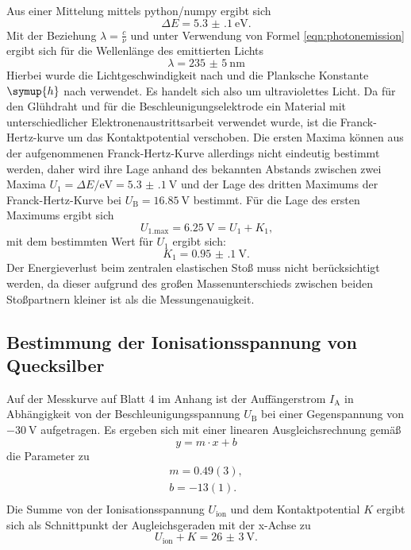Aus einer Mittelung mittels python/numpy \cite{numpy} ergibt sich
\begin{equation}
	\Delta E=\SI{5.3(1)}{\electronvolt} \mathrm{.}
\end{equation}
Mit der Beziehung $\lambda=\frac{c}{\nu}$ und unter Verwendung von Formel
\eqref{eqn:photonemission} ergibt sich für die Wellenlänge des emittierten Lichts
\begin{equation}
	\lambda=\SI{235(5)}{\nano\meter}
\end{equation}
Hierbei wurde die Lichtgeschwindigkeit nach \cite{c} und die Planksche Konstante $\symup{h}$ nach \cite{h} verwendet.
Es handelt sich also um ultraviolettes Licht.
Da für den Glühdraht und für die Beschleunigungselektrode ein Material mit unterschiedlicher Elektronenaustrittsarbeit verwendet wurde, ist die Franck-Hertz-kurve um das Kontaktpotential verschoben.
Die ersten Maxima können aus der aufgenommenen Franck-Hertz-Kurve allerdings nicht eindeutig bestimmt werden, daher wird ihre Lage anhand des bekannten Abstands zwischen zwei Maxima $U_1=\Delta E/\si{\electronvolt}=\SI{5.3(1)}{\volt}$ und der Lage des dritten Maximums der Franck-Hertz-Kurve bei $U_\mathrm{B}=\SI{16.85}{\volt}$ bestimmt.
Für die Lage des ersten Maximums ergibt sich
\begin{equation}
	U_\mathrm{1.max}=\SI{6.25}{\volt}=U_1+K_1 \text{,}
\end{equation}
mit dem bestimmten Wert für $U_1$ ergibt sich:
\begin{equation}
	K_1=\SI{0.95(10)}{\volt}\text{.}
\end{equation}
Der Energieverlust beim zentralen elastischen Stoß muss nicht berücksichtigt werden, da dieser aufgrund des großen Massenunterschieds zwischen beiden Stoßpartnern kleiner ist als die Messungenauigkeit.

\FloatBarrier
\subsection{Bestimmung der Ionisationsspannung von Quecksilber}
Auf der Messkurve auf Blatt 4 im Anhang ist der Auffängerstrom $I_{\mathrm{A}}$ in Abhängigkeit
von der Beschleunigungsspannung $U_{\mathrm{B}}$ bei einer Gegenspannung von $-\SI{30}{\volt}$
aufgetragen.
Es ergeben sich mit einer linearen Ausgleichsrechnung gemäß
\begin{equation*}
	y = m \cdot x + b
\end{equation*}
die Parameter zu
\begin{gather*}
	m = 0.49(3) \mathrm{,} \\
	b = -13(1) \mathrm{.}  \\
\end{gather*}
Die Summe von der Ionisationsspannung $U_{\mathrm{ion}}$ und dem Kontaktpotential $K$ ergibt
sich als Schnittpunkt der Augleichsgeraden mit der x-Achse zu
\begin{equation*}
	U_{\mathrm{ion}} + K = \SI{26(3)}{\volt} \mathrm{.}
\end{equation*}
